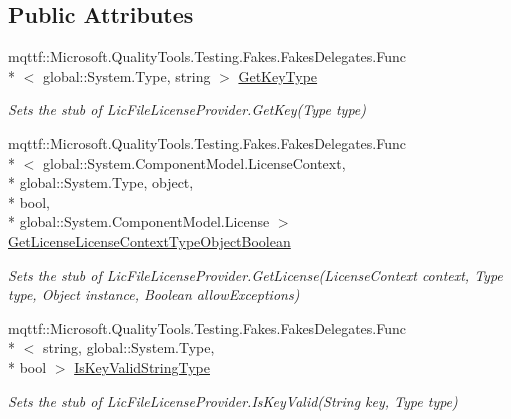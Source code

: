 \subsection*{Public Attributes}
\begin{DoxyCompactItemize}
\item 
mqttf\-::\-Microsoft.\-Quality\-Tools.\-Testing.\-Fakes.\-Fakes\-Delegates.\-Func\\*
$<$ global\-::\-System.\-Type, string $>$ \hyperlink{class_system_1_1_component_model_1_1_fakes_1_1_stub_lic_file_license_provider_af4be0014d5a393e0170e1bd2f771953e}{Get\-Key\-Type}
\begin{DoxyCompactList}\small\item\em Sets the stub of Lic\-File\-License\-Provider.\-Get\-Key(\-Type type)\end{DoxyCompactList}\item 
mqttf\-::\-Microsoft.\-Quality\-Tools.\-Testing.\-Fakes.\-Fakes\-Delegates.\-Func\\*
$<$ global\-::\-System.\-Component\-Model.\-License\-Context, \\*
global\-::\-System.\-Type, object, \\*
bool, \\*
global\-::\-System.\-Component\-Model.\-License $>$ \hyperlink{class_system_1_1_component_model_1_1_fakes_1_1_stub_lic_file_license_provider_a5f40ab8e12f0622c653dd756618741dd}{Get\-License\-License\-Context\-Type\-Object\-Boolean}
\begin{DoxyCompactList}\small\item\em Sets the stub of Lic\-File\-License\-Provider.\-Get\-License(\-License\-Context context, Type type, Object instance, Boolean allow\-Exceptions)\end{DoxyCompactList}\item 
mqttf\-::\-Microsoft.\-Quality\-Tools.\-Testing.\-Fakes.\-Fakes\-Delegates.\-Func\\*
$<$ string, global\-::\-System.\-Type, \\*
bool $>$ \hyperlink{class_system_1_1_component_model_1_1_fakes_1_1_stub_lic_file_license_provider_a15a698e44351cf6f12ed795985bf8a92}{Is\-Key\-Valid\-String\-Type}
\begin{DoxyCompactList}\small\item\em Sets the stub of Lic\-File\-License\-Provider.\-Is\-Key\-Valid(\-String key, Type type)\end{DoxyCompactList}\end{DoxyCompactItemize}
